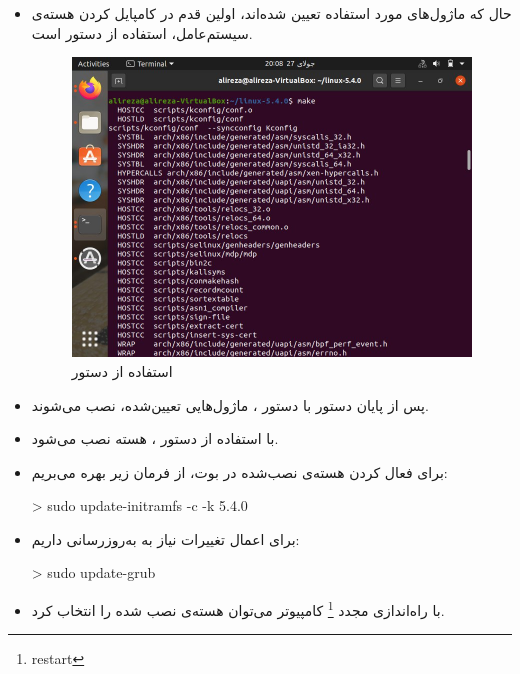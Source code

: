 \begin{itemize}
	
	\item 
		حال که ماژول‌های مورد استفاده تعیین شده‌اند، اولین قدم در کامپایل کردن هسته‌ی سیستم‌عامل، استفاده از دستور 	 است.
		\begin{figure}[!h]
			\centering
			\includegraphics[scale=0.4]{d1.jpeg}
			\caption{استفاده از دستور }
		\end{figure}
		
	\item 
		پس از پایان دستور  با دستور ، ماژول‌هایی تعیین‌شده، نصب می‌شوند.
	\item 
		با استفاده از دستور ، هسته نصب می‌شود.
	\item 
		برای فعال کردن هسته‌ی نصب‌شده در بوت، از فرمان زیر بهره می‌بریم:
		\begin{code}
			> sudo update-initramfs -c -k 5.4.0
		\end{code}
	\item 
		برای اعمال تغییرات نیاز به به‌روزرسانی  داریم:
		\begin{code}
			> sudo update-grub
		\end{code}
	\item 
		با راه‌اندازی مجدد \footnote{restart} کامپیوتر می‌توان هسته‌ی نصب شده را انتخاب کرد.
		
		
\end{itemize}